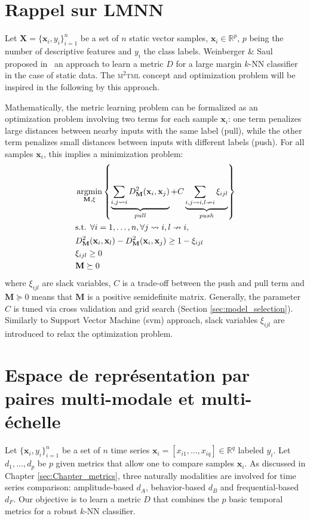 \section*{Rappel sur LMNN}
Let $\textbf{X}=\{\textbf{x}_i,y_i\}_{i=1}^n$ be a set of $n$ static vector samples, ${\textbf{x}_i \in \mathbb{R}^{p}}$, $p$ being the number of descriptive features and $y_i$ the class labels. Weinberger \& Saul proposed in~\cite{Weinberger2009} an approach to learn a metric $D$ for a large margin $k$-NN classifier in the case of static data. The \textsc{m$^2$tml} concept and optimization problem will be inspired in the following by this approach.

Mathematically, the metric learning problem can be formalized as an optimization problem involving two terms for each sample $\textbf{x}_i$: one term penalizes large distances between nearby inputs with the same label (pull), while the other term penalizes small distances between inputs with different labels (push). For all samples $\textbf{x}_i$, this implies a minimization problem:
\begin{equation}
\begin{aligned}
&\displaystyle 		 \argmin_{\textbf{M},\xi} \left\lbrace \underbrace{
	\sum\limits_{i,j \rightsquigarrow i}
	D^2_\textbf{M}(\textbf{x}_i,\textbf{x}_j)
}_{pull}
+
C
\underbrace{
	\sum\limits_{i,j \rightsquigarrow i,l \nrightarrow i} \xi_{ijl}
}
_{push} \right\rbrace \\
&\text{s.t.  } \forall i = 1,\ldots, n, \forall j \rightsquigarrow i, l \nrightarrow i, \\
& D^2_\textbf{M}(\textbf{x}_i,\textbf{x}_l) - D^2_\textbf{M}(\textbf{x}_i,\textbf{x}_j)  \geq 1-\xi_{ijl} \\
& \xi_{ijl} \geq 0 \\
& \textbf{M} \succeq 0
\label{eq:OptimizationProblem}
\end{aligned}
\end{equation}
\noindent where $\xi_{ijl}$ are slack variables, $C$ is a trade-off between the push and pull term and $\textbf{M} \succeq 0$ means that $\textbf{M}$ is a positive semidefinite matrix. Generally, the parameter $C$ is tuned via cross validation and grid search (Section \ref{sec:model_selection}). Similarly to Support Vector Machine ({\sc svm}) approach, slack variables $\xi_{ijl}$ are introduced to relax the optimization problem. 


\section*{Espace de représentation par paires multi-modale et multi-échelle}
Let $\{\textbf{x}_{i}, y_{i}\}_{i=1}^n$ be a set of $n$ time series $\textbf{x}_i = [x_{i1}, \ldots, x_{iq}] \in \mathbb{R}^q$ labeled $y_{i}$. Let  $d_1, \ldots , d_p$ be $p$ given metrics that allow one to compare samples $\textbf{x}_{i}$. As discussed in Chapter \ref{sec:Chapter_metrics}, three naturally modalities are involved for time series comparison: amplitude-based $d_A$, behavior-based $d_B$ and frequential-based $d_F$. Our objective is to learn a metric $D$ that combines the $p$ basic temporal metrics for a robust $k$-NN classifier.

